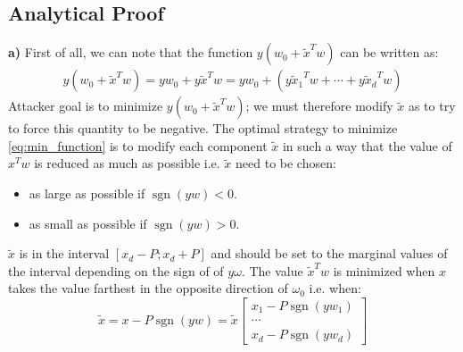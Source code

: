 \documentclass[a4paper,12pt]{report}
\begin{document}
\subsection{Analytical Proof}
\textbf{a)} First of all, we can note that the function $y(w_0 + {\tilde{x}}^T w)$ can be written as:
\begin{align}
    y(w_0 + {\tilde{x}}^T w) = y w_0 + y {\tilde{x}}^T w = y w_0 + (y {\tilde{x}_1}^T w + \cdots + y {\tilde{x}_d}^T w)
\end{align}
Attacker goal is to minimize $y(w_0 + {\tilde{x}}^T w)$; we must therefore modify $\tilde{x}$ as to try to force this quantity to be negative. The optimal strategy to minimize \eqref{eq:min_function} is to modify each component $\tilde{x}$ in such a way that the value of ${x}^T w$ is reduced as much as possible i.e. $\tilde{x}$ need to be chosen:
\begin{itemize}[label=-]
     \item as large as possible if $\operatorname{sgn}(yw) < 0$.
     \item as small as possible if $\operatorname{sgn}(yw) > 0$.
\end{itemize}

$\tilde{x}$ is in the interval $[x_d - P; x_d + P]$ and should be set to the marginal values of the interval depending on the sign of of $y \omega$. The value $\tilde{x}^T w$ is minimized when $x$ takes the value farthest in the opposite direction of $\omega_0$ i.e. when:
\begin{equation}
    \tilde{x} = x - P \operatorname{sgn}(yw) = \tilde{x} 
    \begin{bmatrix}
        x_1 - P \operatorname{sgn}(yw_1) \\[5pt]
        \cdots \\[5pt]
        x_d - P \operatorname{sgn}(yw_d)
    \end{bmatrix}
\end{equation}
\end{document}
